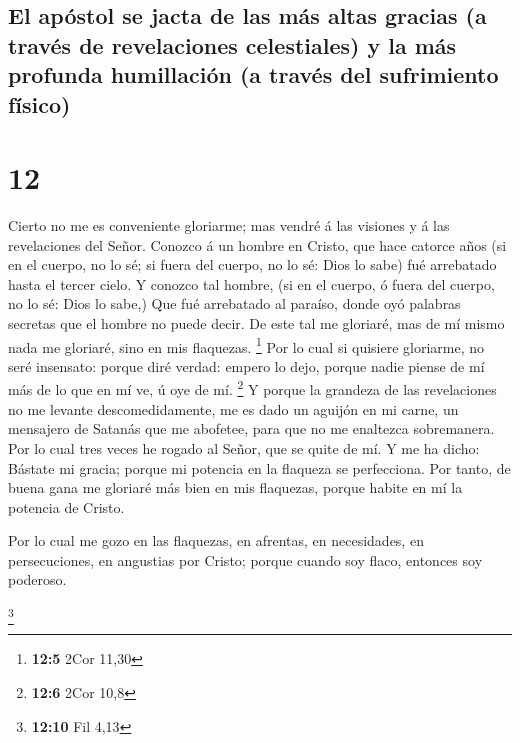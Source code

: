 \hypertarget{el-apuxf3stol-se-jacta-de-las-muxe1s-altas-gracias-a-travuxe9s-de-revelaciones-celestiales-y-la-muxe1s-profunda-humillaciuxf3n-a-travuxe9s-del-sufrimiento-fuxedsico}{%
\subsection{El apóstol se jacta de las más altas gracias (a través de
revelaciones celestiales) y la más profunda humillación (a través del
sufrimiento
físico)}\label{el-apuxf3stol-se-jacta-de-las-muxe1s-altas-gracias-a-travuxe9s-de-revelaciones-celestiales-y-la-muxe1s-profunda-humillaciuxf3n-a-travuxe9s-del-sufrimiento-fuxedsico}}

\hypertarget{section-11}{%
\section{12}\label{section-11}}

 Cierto no me es conveniente gloriarme; mas vendré á las
visiones y á las revelaciones del Señor.  Conozco á un
hombre en Cristo, que hace catorce años (si en el cuerpo, no lo sé; si
fuera del cuerpo, no lo sé: Dios lo sabe) fué arrebatado hasta el tercer
cielo.  Y conozco tal hombre, (si en el cuerpo, ó fuera del
cuerpo, no lo sé: Dios lo sabe,)  Que fué arrebatado al
paraíso, donde oyó palabras secretas que el hombre no puede decir.
 De este tal me gloriaré, mas de mí mismo nada me gloriaré,
sino en mis flaquezas. \footnote{\textbf{12:5} 2Cor 11,30} 
Por lo cual si quisiere gloriarme, no seré insensato: porque diré
verdad: empero lo dejo, porque nadie piense de mí más de lo que en mí
ve, ú oye de mí. \footnote{\textbf{12:6} 2Cor 10,8}  Y
porque la grandeza de las revelaciones no me levante descomedidamente,
me es dado un aguijón en mi carne, un mensajero de Satanás que me
abofetee, para que no me enaltezca sobremanera.  Por lo cual
tres veces he rogado al Señor, que se quite de mí.  Y me ha
dicho: Bástate mi gracia; porque mi potencia en la flaqueza se
perfecciona. Por tanto, de buena gana me gloriaré más bien en mis
flaquezas, porque habite en mí la potencia de Cristo.

 Por lo cual me gozo en las flaquezas, en afrentas, en
necesidades, en persecuciones, en angustias por Cristo; porque cuando
soy flaco, entonces soy poderoso.

\footnote{\textbf{12:10} Fil 4,13}

